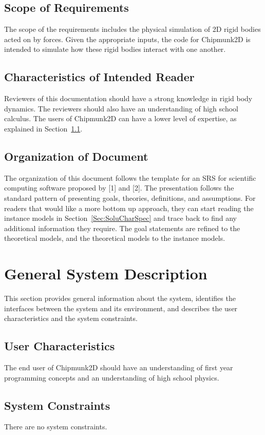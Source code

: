 \documentclass[12pt]{article}
\begin{document}
\subsection{Scope of Requirements}
\label{Sec:ScopofRequ}
The scope of the requirements includes the physical simulation of 2D rigid bodies acted on by forces. Given the appropriate inputs, the code for Chipmunk2D is intended to simulate how these rigid bodies interact with one another.
\subsection{Characteristics of Intended Reader}
\label{Sec:CharofInteRead}
Reviewers of this documentation should have a strong knowledge in rigid body dynamics. The reviewers should also have an understanding of high school calculus. The users of Chipmunk2D can have a lower level of expertise, as explained in Section~\ref{Sec:UserChar}.
\subsection{Organization of Document}
\label{Sec:OrgaofDocu}
The organization of this document follows the template for an SRS for scientific computing software proposed by {[}1{]} and {[}2{]}. The presentation follows the standard pattern of presenting goals, theories, definitions, and assumptions. For readers that would like a more bottom up approach, they can start reading the instance models in Section~\ref{Sec:SoluCharSpec} and trace back to find any additional information they require.
The goal statements are refined to the theoretical models, and the theoretical models to the instance models.
\section{General System Description}
\label{Sec:GeneSystDesc}
This section provides general information about the system, identifies the interfaces between the system and its environment, and describes the user characteristics and the system constraints.
\subsection{User Characteristics}
\label{Sec:UserChar}
The end user of Chipmunk2D should have an understanding of first year programming concepts and an understanding of high school physics.
\subsection{System Constraints}
\label{Sec:SystCons}
There are no system constraints.
\end{document}
